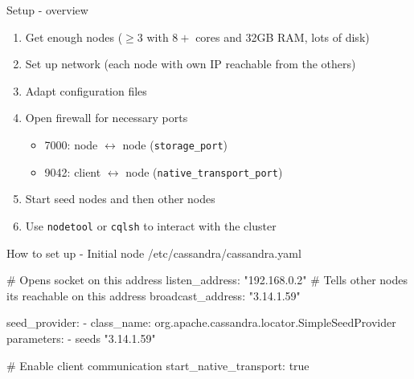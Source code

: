 \documentclass[
  10pt
]{beamer}
\begin{document}
\begin{frame}{Setup - overview}
  \begin{enumerate}
    \item<1-> Get enough nodes ($\geq3$ with $8+$ cores and 32GB RAM, lots of disk)
    \item<2-> Set up network (each node with own IP reachable from the others)
    \item<3-> Adapt configuration files
    \item<4-> Open firewall for necessary ports
    \begin{itemize}
      \item 7000: node $\leftrightarrow$ node (\lstinline{storage_port})
      \item 9042: client $\leftrightarrow$ node (\lstinline{native_transport_port})
    \end{itemize}
    \item<5-> Start seed nodes and then other nodes
    \item<6-> Use \lstinline{nodetool} or \lstinline{cqlsh} to interact with the cluster
  \end{enumerate}
\end{frame}

\begin{frame}[fragile]{How to set up - Initial node}
  /etc/cassandra/cassandra.yaml
  \begin{semiverbatim}
# Opens socket on this address
listen_address: "192.168.0.2"
# Tells other nodes its reachable on this address
broadcast_address: "3.14.1.59"

seed_provider:
  - class_name: org.apache.cassandra.locator.SimpleSeedProvider
    parameters:
      - seeds "3.14.1.59"

# Enable client communication
start_native_transport: true
  \end{semiverbatim}
\end{frame}
\end{document}
